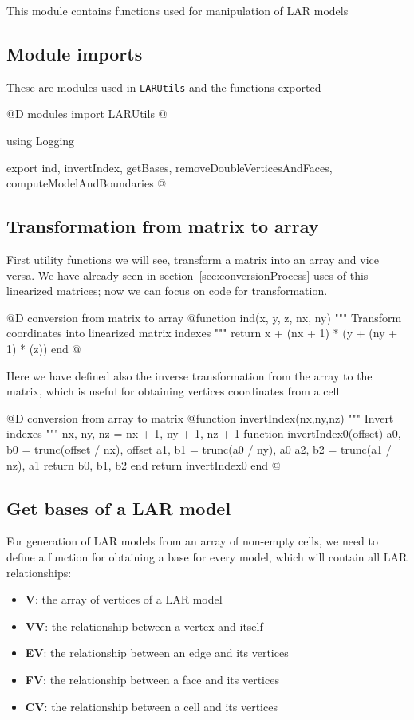 \documentclass[11pt,oneside]{article}	%
\begin{document}
This module contains functions used for manipulation of LAR models

\subsection{Module imports}\label{sec:LARUtilsImports}

These are modules used in \texttt{LARUtils} and the functions exported

@D modules import LARUtils
@{using Logging

export ind, invertIndex, getBases, removeDoubleVerticesAndFaces,
    computeModelAndBoundaries
@}

\subsection{Transformation from matrix to array}\label{sec:matrixTransform}

First utility functions we will see, transform a matrix into an array and vice versa. We have already seen in section~\ref{sec:conversionProcess} uses of this linearized matrices; now we can focus on code for transformation.

@D conversion from matrix to array
@{function ind(x, y, z, nx, ny)
    """
    Transform coordinates into linearized matrix indexes
    """
    return x + (nx + 1) * (y + (ny + 1) * (z))
end @}

Here we have defined also the inverse transformation from the array to the matrix, which is useful for obtaining vertices coordinates from a cell

@D conversion from array to matrix
@{function invertIndex(nx,ny,nz)
  """
  Invert indexes
  """
  nx, ny, nz = nx + 1, ny + 1, nz + 1
  function invertIndex0(offset)
      a0, b0 = trunc(offset / nx), offset %
      a1, b1 = trunc(a0 / ny), a0 %
      a2, b2 = trunc(a1 / nz), a1 %
      return b0, b1, b2
  end
  return invertIndex0
end @}

\subsection{Get bases of a LAR model}\label{sec:getBases}

For generation of LAR models from an array of non-empty cells, we need to define a function for obtaining a base for every model, which will contain all LAR relationships:
\begin{itemize}
 \item \textbf{V}: the array of vertices of a LAR model
 \item \textbf{VV}: the relationship between a vertex and itself
 \item \textbf{EV}: the relationship between an edge and its vertices
 \item \textbf{FV}: the relationship between a face and its vertices
 \item \textbf{CV}: the relationship between a cell and its vertices
\end{itemize}
\end{document}
